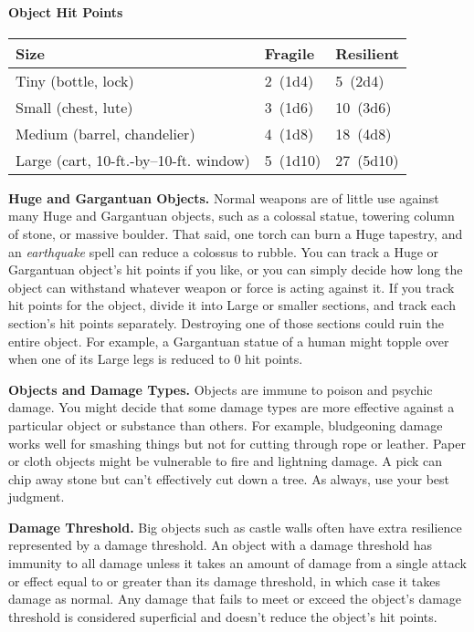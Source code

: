 \documentclass[
]{article}
\begin{document}
\hypertarget{object-hit-points}{%
\paragraph{Object Hit Points}\label{object-hit-points}}

\begin{longtable}[]{@{}lll@{}}
\toprule
Size & Fragile & Resilient\tabularnewline
\midrule
\endhead
Tiny (bottle, lock) & 2~(1d4) & 5~(2d4)\tabularnewline
Small (chest, lute) & 3~(1d6) & 10~(3d6)\tabularnewline
Medium (barrel, chandelier) & 4~(1d8) & 18~(4d8)\tabularnewline
Large (cart, 10-ft.-by--10-ft. window) & 5~(1d10) &
27~(5d10)\tabularnewline
\bottomrule
\end{longtable}

\textbf{Huge and Gargantuan Objects.} Normal weapons are of little use
against many Huge and Gargantuan objects, such as a colossal statue,
towering column of stone, or massive boulder. That said, one torch can
burn a Huge tapestry, and an \emph{earthquake} spell can reduce a
colossus to rubble. You can track a Huge or Gargantuan object's hit
points if you like, or you can simply decide how long the object can
withstand whatever weapon or force is acting against it. If you track
hit points for the object, divide it into Large or smaller sections, and
track each section's hit points separately. Destroying one of those
sections could ruin the entire object. For example, a Gargantuan statue
of a human might topple over when one of its Large legs is reduced to 0
hit points.

\textbf{Objects and Damage Types.} Objects are immune to poison and
psychic damage. You might decide that some damage types are more
effective against a particular object or substance than others. For
example, bludgeoning damage works well for smashing things but not for
cutting through rope or leather. Paper or cloth objects might be
vulnerable to fire and lightning damage. A pick can chip away stone but
can't effectively cut down a tree. As always, use your best judgment.

\textbf{Damage Threshold.} Big objects such as castle walls often have
extra resilience represented by a damage threshold. An object with a
damage threshold has immunity to all damage unless it takes an amount of
damage from a single attack or effect equal to or greater than its
damage threshold, in which case it takes damage as normal. Any damage
that fails to meet or exceed the object's damage threshold is considered
superficial and doesn't reduce the object's hit points.
\end{document}
